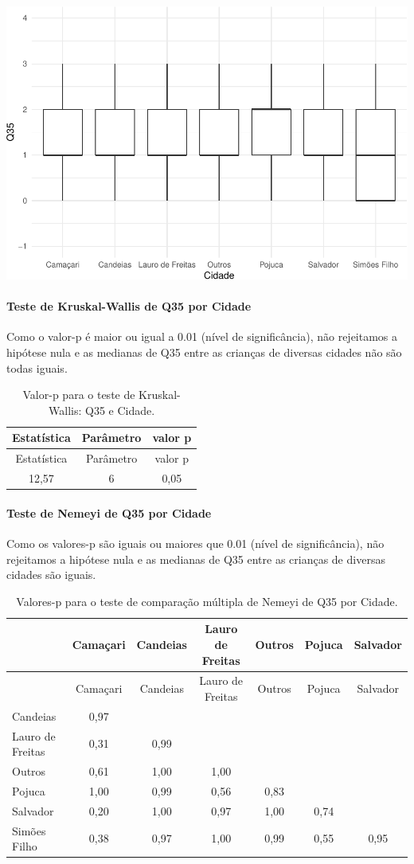 \documentclass[]{article}
\let\oldparagraph\paragraph
\renewcommand{\paragraph}[1]{\oldparagraph{#1}\mbox{}}
\begin{document}
\begin{center}\includegraphics[width=0.75\linewidth]{relatorio_covid19_files/figure-latex/unnamed-chunk-1256-1} \end{center}

\hypertarget{teste-de-kruskal-wallis-de-q35-por-cidade}{%
\paragraph{Teste de Kruskal-Wallis de Q35 por Cidade}\label{teste-de-kruskal-wallis-de-q35-por-cidade}}

Como o valor-p é maior ou igual a 0.01 (nível de significância), não rejeitamos a hipótese nula e as medianas de Q35 entre as crianças de diversas cidades não são todas iguais.

\begin{longtable}[]{@{}ccc@{}}
\caption{\label{tab:unnamed-chunk-1258}Valor-p para o teste de Kruskal-Wallis: Q35 e Cidade.}\tabularnewline
\toprule
Estatística & Parâmetro & valor p\tabularnewline
\midrule
\endfirsthead
\toprule
Estatística & Parâmetro & valor p\tabularnewline
\midrule
\endhead
12,57 & 6 & 0,05\tabularnewline
\bottomrule
\end{longtable}

\hypertarget{teste-de-nemeyi-de-q35-por-cidade}{%
\paragraph{Teste de Nemeyi de Q35 por Cidade}\label{teste-de-nemeyi-de-q35-por-cidade}}

Como os valores-p são iguais ou maiores que 0.01 (nível de significância), não rejeitamos a hipótese nula e as medianas de Q35 entre as crianças de diversas cidades são iguais.

\begin{longtable}[]{@{}lcccccc@{}}
\caption{\label{tab:unnamed-chunk-1260}Valores-p para o teste de comparação múltipla de Nemeyi de Q35 por Cidade.}\tabularnewline
\toprule
& Camaçari & Candeias & Lauro de Freitas & Outros & Pojuca & Salvador\tabularnewline
\midrule
\endfirsthead
\toprule
& Camaçari & Candeias & Lauro de Freitas & Outros & Pojuca & Salvador\tabularnewline
\midrule
\endhead
Candeias & 0,97 & & & & &\tabularnewline
Lauro de Freitas & 0,31 & 0,99 & & & &\tabularnewline
Outros & 0,61 & 1,00 & 1,00 & & &\tabularnewline
Pojuca & 1,00 & 0,99 & 0,56 & 0,83 & &\tabularnewline
Salvador & 0,20 & 1,00 & 0,97 & 1,00 & 0,74 &\tabularnewline
Simões Filho & 0,38 & 0,97 & 1,00 & 0,99 & 0,55 & 0,95\tabularnewline
\bottomrule
\end{longtable}
\end{document}
